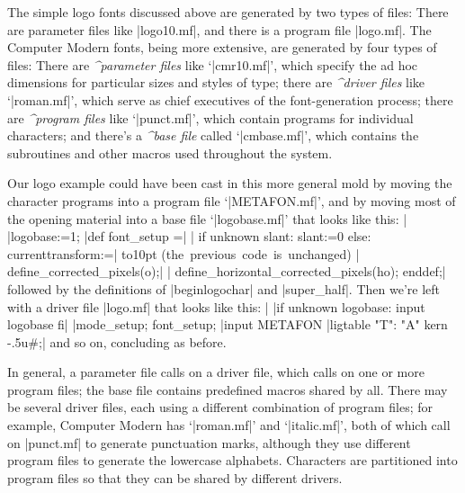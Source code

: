 The simple logo fonts discussed above are generated by two types
of files: There are parameter files like |logo10.mf|, and there is
a program file |logo.mf|. The Computer Modern fonts, being more
extensive, are generated by four types of files: There are
{\sl^{parameter files}\/} like `|cmr10.mf|', which specify the
ad hoc dimensions for particular sizes and styles of type; there are
{\sl^{driver files}\/} like `|roman.mf|', which serve as chief
executives of the font-generation process; there are
{\sl^{program files}\/} like `|punct.mf|', which contain programs
for individual characters; and there's a {\sl^{base file}\/} called
`|cmbase.mf|', which contains the subroutines and other macros used
throughout the system.

Our logo example could have been cast in this more general mold by moving
the character programs into a program file `|METAFON.mf|', and by moving
most of the opening material into a base file `|logobase.mf|'
that looks like this:
\beginlines
|%
|logobase:=1;           %
\smallskip
|def font_setup =|
| if unknown slant: slant:=0 else: currenttransform:=|
\qquad\smash{\vdots}\qquad\vbox to10pt{}%
 \hbox{(the previous code is unchanged)}
| define_corrected_pixels(o);|
| define_horizontal_corrected_pixels(ho); enddef;|
\endlines
followed by the definitions of |beginlogochar| and |super_half|.
Then we're left with a driver file |logo.mf| that looks like this:
\beginlines
|%
|if unknown logobase: input logobase fi|
\smallskip
|mode_setup; font_setup;                  %
|input METAFON                            %
\smallskip
|ligtable "T": "A" kern -.5u#;|
\weakendlines
and so on, concluding as before.

In general, a parameter file calls on a driver file, which calls on
one or more program files; the base file contains predefined macros
shared by all. There may be several driver files, each using a
different combination of program files; for example, Computer Modern
has `|roman.mf|' and `|italic.mf|', %
both of which call on |punct.mf| to generate punctuation marks,
although they use different program files to generate the lowercase
alphabets. Characters are partitioned into program files so that
they can be shared by different drivers.

